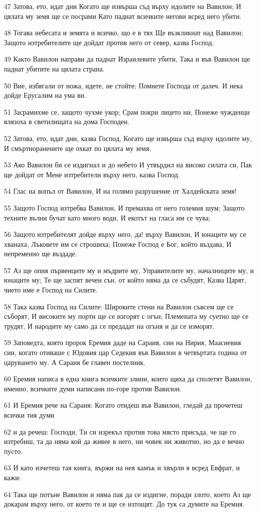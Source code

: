 \par 47 Затова, ето, идат дни Когато ще извърша съд върху идолите на Вавилон; И цялата му земя ще се посрами Като паднат всичките негови всред него убити.
\par 48 Тогава небесата и земята и всичко, що е в тях Ще възкликнат над Вавилон; Защото изтребителите ще дойдат против него от север, казва Господ.
\par 49 Както Вавилон направи да паднат Израилевите убити, Така и във Вавилон ще паднат убитите на цялата страна.
\par 50 Вие, избягали от ножа, идете, не стойте; Помнете Господа от далеч. И нека дойде Ерусалим на ума ви.
\par 51 Засрамихме се, защото чухме укор; Срам покри лицето ни, Понеже чужденци влязоха в светилищата на дома Господен.
\par 52 Затова, ето, идат дни, казва Господ, Когато ще извърша съд върху идолите му, И смъртноранените ще охкат по цялата му земя.
\par 53 Ако Вавилон би се издигнал и до небето И утвърдил на високо силата си, Пак ще дойдат от Мене изтребители върху него, казва Господ.
\par 54 Глас на вопъл от Вавилон, И на голямо разрушение от Халдейската земя!
\par 55 Защото Господ изтребва Вавилон, И премахва от него големия шум; Защото техните вълни бучат като много води, И екотът на гласа им се чува;
\par 56 Защото изтребителят дойде върху него, да! върху Вавилон, И юнаците му се хванаха, Лъковете им се строшиха; Понеже Господ е Бог, който въздава, И непременно ще въздаде.
\par 57 Аз ще опия първенците му и мъдрите му, Управителите му, началниците му, и юнаците му; Те ще заспят вечен сън, от който няма да се събудят, Казва Царят, чието име е Господ на Силите.
\par 58 Така казва Господ на Силите: Широките стени на Вавилон съвсем ще се съборят, И високите му порти ще се изгорят с огън; Племената му суетно ще се трудят, И народите му само да се предадат на огъня и да се изморят.
\par 59 Заповедта, която пророк Еремия даде на Сараия, син на Нирия, Маасиевия син, когато отиваше с Юдовия цар Седекия във Вавилон в четвъртата година от царуването му. А Сараия бе главен постелник.
\par 60 Еремия написа в една книга всичките злини, които щяха да сполетят Вавилон, именно, всичките думи написани по-горе против Вавилон.
\par 61 И Еремия рече на Сараия: Когато отидеш във Вавилон, гледай да прочетеш всички тия думи
\par 62 и да речеш: Господи, Ти си изрекъл против това място присъда, че ще го изтребиш, та да няма кой да живее в него, ни човек ни животно, но да е вечно пусто.
\par 63 И като изчетеш тая книга, вържи на нея камък и хвърли я всред Евфрат, и кажи:
\par 64 Така ще потъне Вавилон и няма пак да се издигне, поради злото, което Аз ще докарам върху него, от което те и ще се изтощят. До тук са думите на Еремия.

